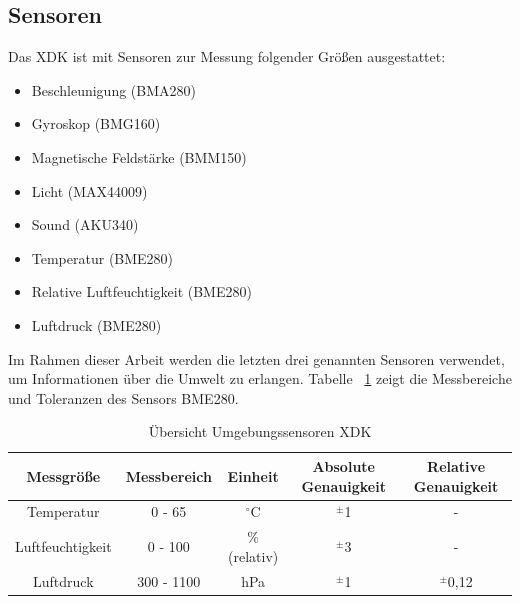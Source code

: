 \subsection{Sensoren}\label{subsec:Sensoren}
Das \acs*{XDK} ist mit Sensoren zur Messung folgender Größen ausgestattet:
\begin{itemize} 
	\item Beschleunigung (BMA280)
	\item Gyroskop (BMG160)
	\item Magnetische Feldstärke (BMM150)
	\item Licht (MAX44009)
	\item Sound (AKU340)
	\item Temperatur (BME280)
	\item Relative Luftfeuchtigkeit (BME280)
	\item Luftdruck (BME280)
\end{itemize}
Im Rahmen dieser Arbeit werden die letzten drei genannten Sensoren verwendet, um Informationen über die Umwelt zu erlangen. Tabelle ~\ref{tab:XDK Sensoren} zeigt die Messbereiche und Toleranzen des Sensors BME280.
\begin{table}[H]
	\begin{center}
		\begin{tabular}{|c|c|c|c|c|}
			\hline
			Messgröße & Messbereich & Einheit & Absolute Genauigkeit & Relative Genauigkeit  \\ \hline \hline
			
			Temperatur & 0 - 65 & $^\circ$C & $^\pm$1 & - \\ \hline 
			
			Luftfeuchtigkeit & 0 - 100 & \% (relativ) & $^\pm$3 & - \\ \hline 
			
			Luftdruck & 300 - 1100 & hPa & $^\pm$1 & $^\pm$0,12 \\ \hline 
			
		\end{tabular}
		
	\end{center}
	\caption{Übersicht Umgebungssensoren \acs{XDK}}
	\label{tab:XDK Sensoren}
\end{table}

